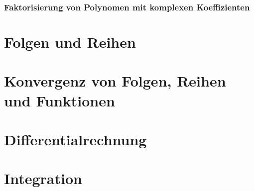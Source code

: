 \documentclass[german]{spicker}
\begin{document}
\subsubsection{Faktorisierung von Polynomen mit komplexen Koeffizienten}

\section{Folgen und Reihen}

\section{Konvergenz von Folgen, Reihen und Funktionen}

\section{Differentialrechnung}

\section{Integration}
\end{document}
